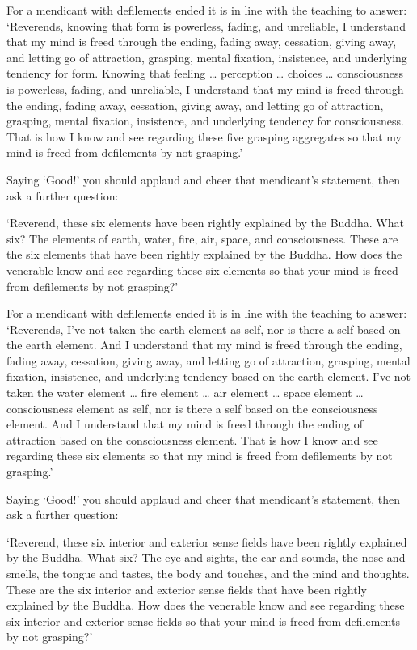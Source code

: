 \documentclass[12pt,openany]{book}%
\begin{document}
For a mendicant with defilements ended it is in line with the teaching to answer: ‘Reverends, knowing that form is powerless, fading, and unreliable, I understand that my mind is freed through the ending, fading away, cessation, giving away, and letting go of attraction, grasping, mental fixation, insistence, and underlying tendency for form. Knowing that feeling … perception … choices … consciousness is powerless, fading, and unreliable, I understand that my mind is freed through the ending, fading away, cessation, giving away, and letting go of attraction, grasping, mental fixation, insistence, and underlying tendency for consciousness. That is how I know and see regarding these five grasping aggregates so that my mind is freed from defilements by not grasping.’ 

Saying ‘Good!’ you should applaud and cheer that mendicant’s statement, then ask a further question: 

‘Reverend, these six elements have been rightly explained by the Buddha. What six? The elements of earth, water, fire, air, space, and consciousness. These are the six elements that have been rightly explained by the Buddha. How does the venerable know and see regarding these six elements so that your mind is freed from defilements by not grasping?’ 

For a mendicant with defilements ended it is in line with the teaching to answer: ‘Reverends, I’ve not taken the earth element as self, nor is there a self based on the earth element. And I understand that my mind is freed through the ending, fading away, cessation, giving away, and letting go of attraction, grasping, mental fixation, insistence, and underlying tendency based on the earth element. I’ve not taken the water element … fire element … air element … space element … consciousness element as self, nor is there a self based on the consciousness element. And I understand that my mind is freed through the ending of attraction based on the consciousness element. That is how I know and see regarding these six elements so that my mind is freed from defilements by not grasping.’ 

Saying ‘Good!’ you should applaud and cheer that mendicant’s statement, then ask a further question: 

‘Reverend, these six interior and exterior sense fields have been rightly explained by the Buddha. What six? The eye and sights, the ear and sounds, the nose and smells, the tongue and tastes, the body and touches, and the mind and thoughts. These are the six interior and exterior sense fields that have been rightly explained by the Buddha. How does the venerable know and see regarding these six interior and exterior sense fields so that your mind is freed from defilements by not grasping?’ 
\end{document}
